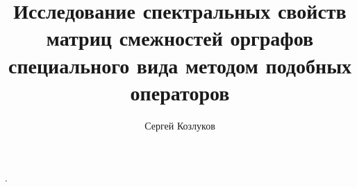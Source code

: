 \documentclass[11pt,a4paper,twoside]{article}
\title{Исследование спектральных свойств матриц
смежностей орграфов специального вида
методом подобных операторов}
\author{Сергей Козлуков}
\begin{document}
\maketitle

\begin{abstract}
    
\end{abstract}


\printbibliography.
\end{document}
